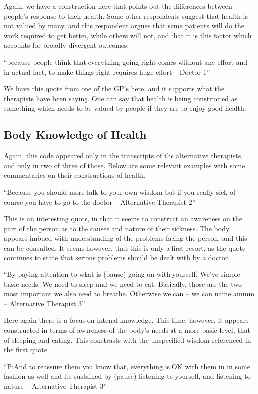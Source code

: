 Again, we have a construction here that points out the differences between people's response to their health. Some other respondents suggest that health is not valued by many, and this respondent argues that some patients will do the work required to get better, while others will not, and that it is this factor which accounts for broadly divergent outcomes. 

``because people think that everything going right comes without any effort and in actual fact, to make things right requires huge effort – Doctor 1''

We have this quote from one of the GP's here, and it supports what the therapists have been saying. One can say that health is being constructed as something which needs to be valued by people if they are to enjoy good health. 

\subsection{Body Knowledge of Health}

Again, this code appeared only in the transcripts of the alternative therapists, and only in two of three of those. Below are some relevant examples with some commentaries on their constructions of health. 

``Because you should more talk to your own wisdom but if you really sick of course you have to go to the doctor – Alternative Therapist 2''

This is an interesting quote, in that it seems to construct an awareness on the part of the person as to the causes and nature of their sickness. The body appears imbued with understanding of the problems facing the person, and this can be consulted. It seems however, that this is only a first resort, as the quote continues to state that serious problems should be dealt with by a doctor.

``By paying attention to what is (pause) going on with yourself. We've simple basic needs. We need to sleep and we need to eat. Basically, those are the two most important we also need to breathe. Otherwise we can – we can name ammm – Alternative Therapist 3''

Here again there is a focus on intenal knowledge. This time, however, it appears constructed in terms of awareness of the body's needs at a more basic level, that of sleeping and eating. This constrasts with the unspecified wisdom referenced in the first quote. 


``P:And to reassure them you know that, everything is OK with them in in some fashion as well and its sustained by (pause) listening to yourself, and listening to nature – Alternative Therapist 3''

